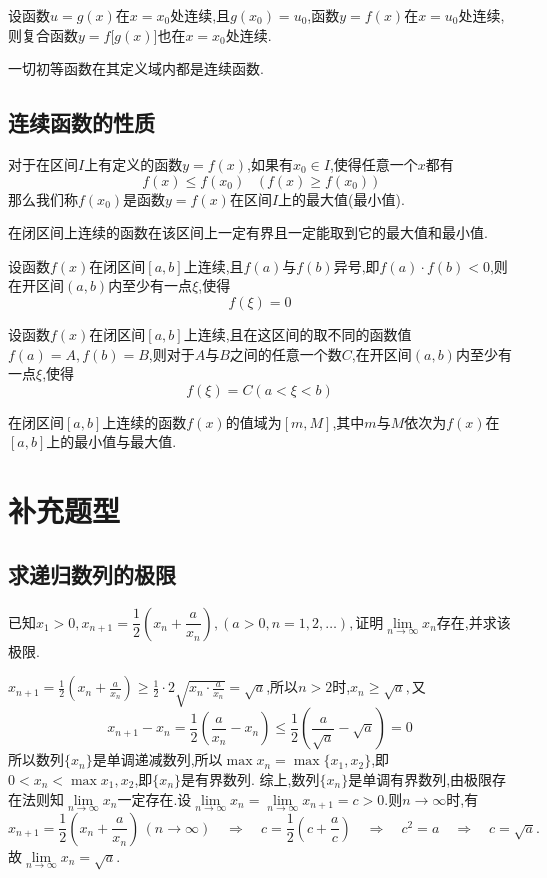 \warn
[
\kg $g(x)$可以不在点$x=x_0$处有连续,但是必须有极限.
]

\theorem[复合函数的连续性\uppercase\expandafter{\romannumeral2}]
设函数$u=g(x)$在$x=x_0$处连续,且$g(x_0)=u_0$,函数$y=f(x)$在$x=u_0$处连续,则复合函数$y=f\big[g(x)\big]$也在$x=x_0$处连续.\jg

\theorem[初等函数的连续性]
一切初等函数在其定义域内都是连续函数.\jg

\subsection{连续函数的性质}

对于在区间$I$上有定义的函数$y=f(x)$,如果有$x_0 \in I$,使得任意一个$x$都有
\[
f(x)\le f(x_0)\quad\big(\,f(x) \geq f(x_0) \,\big)
\]
那么我们称$f(x_0)$是函数$y=f(x)$在区间$I$上的最大值(最小值).
\jg

\theorem[最大值最小值定理]
在闭区间上连续的函数在该区间上一定有界且一定能取到它的最大值和最小值.



\theorem[零点存在性定理]
设函数$f(x)$在闭区间$[a,b]$上连续,且$f(a)$与$f(b)$异号,即$f(a)\cdot f(b)<0$,则在开区间$(a,b)$内至少有一点$\xi$,使得
\[
f(\xi)=0
\]

\theorem[介值定理]
设函数$f(x)$在闭区间$[a,b]$上连续,且在这区间的取不同的函数值$f(a)=A,f(b)=B$,则对于$A$与$B$之间的任意一个数$C$,在开区间$(a,b)$内至少有一点$\xi$,使得
\[
f(\xi)=C(a<\xi<b)
\]

\tl 在闭区间$[a,b]$上连续的函数$f(x)$的值域为$[m,M]$,其中$m$与$M$依次为$f(x)$在$[a,b]$上的最小值与最大值.

\section{补充题型}
\subsection{求递归数列的极限}
\texample[求递归数列的极限]\sj
\examples 已知$x_1>0,x_{n+1}=\dfrac{1}{2}\left(x_n+\dfrac{a}{x_n}\right),(a>0,n=1,2,\ldots),$证明$\lim\limits_{n \to \infty} x_n$存在,并求该极限.

\solve $\displaystyle x_{n+1}=\frac 12\left(x_n+\frac{a}{x_n}\right)\ge \frac 12 \cdot 2\sqrt{x_n\cdot \frac{a}{x_n}}=\sqrt{a}$,所以$n>2$时,$x_n \ge \sqrt{a},$又
\[
x_{n+1}-x_n=\frac{1}{2}\left(\frac{a}{x_n}-x_n\right)\le\frac{1}{2}\left(\frac{a}{\sqrt{a}}-\sqrt{a}\right)=0
\]
所以数列$\{x_n\}$是单调递减数列,所以$\max x_n=\max\{x_1,x_2\}$,即$0<x_n<\max{x_1,x_2}$,即$\{x_n\}$是有界数列.
综上,数列$\{x_n\}$是单调有界数列,由极限存在法则知$\lim\limits_{n \to \infty}x_n$一定存在.设$\lim\limits_{n \to \infty}x_n=\lim\limits_{n \to \infty}x_{n+1}=c>0.$则$n \to \infty$时,有
\[
x_{n+1}=\frac{1}{2}\left(x_n+\frac{a}{x_n}\right)\,(n \to \infty) \quad \Rightarrow \quad c=\frac 12\left( c+\frac ac \right) \quad \Rightarrow \quad c^2=a \quad \Rightarrow \quad c=\sqrt{a}. 
\]
故$\lim\limits_{n \to \infty}x_n=\sqrt{a}.$

